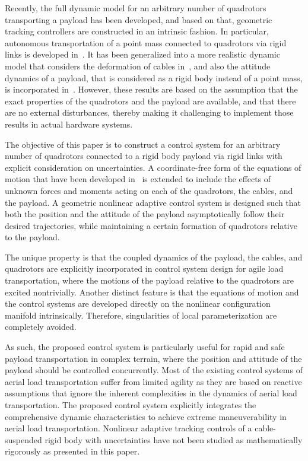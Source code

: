 \documentclass[letterpaper, 10pt, conference]{ieeeconf}
\begin{document}
Recently, the full dynamic model for an arbitrary number of quadrotors transporting a payload has been developed, and based on that, geometric tracking controllers are constructed in an intrinsic fashion. In particular, autonomous transportation of a point mass connected to quadrotors via rigid links is developed in~\cite{LeeSrePICDC13}. It has been generalized into a more realistic dynamic model that considers the deformation of cables in~\cite{GooLeePACC14}, and also the attitude dynamics of a payload, that is considered as a rigid body instead of a point mass, is incorporated in~\cite{LeePICDC14}. However, these results are based on the assumption that the exact properties of the quadrotors and the payload are available, and that there are no external disturbances, thereby making it challenging to implement those results in  actual hardware systems. 

The objective of this paper is to construct a control system for an arbitrary number of quadrotors connected to a rigid body payload via rigid links with explicit consideration on uncertainties. A coordinate-free form of the equations of motion that have been developed in~\cite{LeePICDC14} is extended to include the effects of unknown forces and moments acting on each of the quadrotors, the cables, and the payload. A geometric nonlinear adaptive control system is designed such that both the position and the attitude of the payload asymptotically follow their desired trajectories, while maintaining a certain formation of quadrotors relative to the payload. 

The unique property is that the coupled dynamics of the payload, the cables, and quadrotors are explicitly incorporated in control system design for agile load transportation, where the motions of the payload relative to the quadrotors are excited nontrivially. Another distinct feature is that the equations of motion and the control systems are developed directly on the nonlinear configuration manifold intrinsically. Therefore, singularities of local parameterization are completely avoided.

As such, the proposed control system is particularly useful for rapid and safe payload transportation in complex terrain, where the position and attitude of the payload should be controlled concurrently. Most of the existing control systems of aerial load transportation suffer from limited agility as they are based on reactive assumptions that ignore the inherent complexities in the dynamics of aerial load transportation. The proposed control system explicitly integrates the comprehensive dynamic characteristics to achieve extreme maneuverability in aerial load transportation. Nonlinear adaptive tracking controls of a cable-suspended rigid body with uncertainties have not been studied as mathematically rigorously as presented in this paper. 
\end{document}
